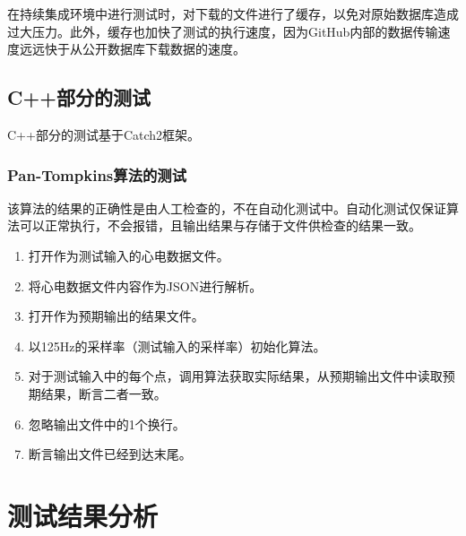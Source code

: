 在持续集成环境中进行测试时，对下载的文件进行了缓存，以免对原始数据库造成过大压力。此外，缓存也加快了测试的执行速度，因为GitHub内部的数据传输速度远远快于从公开数据库下载数据的速度。

\subsection{C++部分的测试}\label{subsec:test-cpp}

C++部分的测试基于Catch2框架。

\subsubsection{Pan-Tompkins算法的测试}

该算法的结果的正确性是由人工检查的，不在自动化测试中。自动化测试仅保证算法可以正常执行，不会报错，且输出结果与存储于文件供检查的结果一致。

\begin{enumerate}
    \item 打开作为测试输入的心电数据文件。
    \item 将心电数据文件内容作为JSON进行解析。
    \item 打开作为预期输出的结果文件。
    \item 以125Hz的采样率（测试输入的采样率）初始化算法。
    \item 对于测试输入中的每个点，调用算法获取实际结果，从预期输出文件中读取预期结果，断言二者一致。
    \item 忽略输出文件中的1个换行。
    \item 断言输出文件已经到达末尾。
\end{enumerate}


\section{测试结果分析}\label{sec:test-result}

